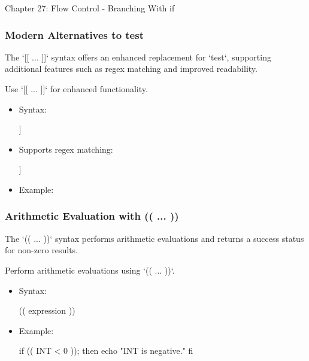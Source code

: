 \begin{notes}{Chapter 27: Flow Control - Branching With if}
    \subsubsection*{Modern Alternatives to test}
    
    The `[[ ... ]]` syntax offers an enhanced replacement for `test`, supporting additional features such as regex matching and improved readability.
    
    \begin{highlight}
    
    Use `[[ ... ]]` for enhanced functionality.
    
    \begin{itemize}
        \item Syntax:
    \begin{code}[Shell]
    [[ expression ]]
    \end{code}
        \item Supports regex matching:
    \begin{code}[Shell]
    [[ string =~ regex ]]
    \end{code}
        \item Example:
    \end{itemize}
    
    \end{highlight}
    
    \subsubsection*{Arithmetic Evaluation with (( ... ))}
    
    The `(( ... ))` syntax performs arithmetic evaluations and returns a success status for non-zero results.
    
    \begin{highlight}
    
    Perform arithmetic evaluations using `(( ... ))`.
    
    \begin{itemize}
        \item Syntax:
    \begin{code}[Shell]
    (( expression ))
    \end{code}
        \item Example:
    \begin{code}[Shell]
    if (( INT < 0 )); then
        echo "INT is negative."
    fi
    \end{code}
    \end{itemize}
    

\end{highlight}
\end{notes}
